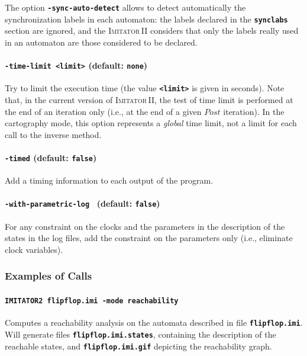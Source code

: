 \documentclass[a4paper,10pt]{article}
\newcommand{\imitatordeux}{\textsc{Imitator}\,II}
\newcommand{\imitatordeuxExec}{\code{IMITATOR2}}
\newcommand{\code}[1]{\textbf{\texttt{#1}}}
\begin{document}
The option \code{-sync-auto-detect} allows to detect automatically the synchronization labels in each automaton: the labels declared in the \code{synclabs} section are ignored, and the \imitatordeux{} considers that only the labels really used in an automaton are those considered to be declared.


\paragraph{\code{-time-limit <limit>} (default: \code{none})}
Try to limit the execution time (the value \code{<limit>} is given in seconds).
Note that, in the current version of \imitatordeux{}, the test of time limit is performed at the end of an iteration only (i.e., at the end of a given $\mathit{Post}$ iteration).
In the cartography mode, this option represents a \emph{global} time limit, not a limit for each call to the inverse method.


\paragraph{\code{-timed} (default: \code{false})}
Add a timing information to each output of the program.


\paragraph{\code{-with-parametric-log } (default: \code{false})}
For any constraint on the clocks and the parameters in the description of the states in the log files,
add the constraint on the parameters only (i.e., eliminate clock variables).



\subsubsection{Examples of Calls}

\paragraph{\code{\imitatordeuxExec{} flipflop.imi -mode reachability}}
Computes a reachability analysis on the automata described in file \code{flipflop.imi}.
Will generate files \code{flipflop.imi.states}, containing the description of the reachable states, and \code{flipflop.imi.gif} depicting the reachability graph.
\end{document}
